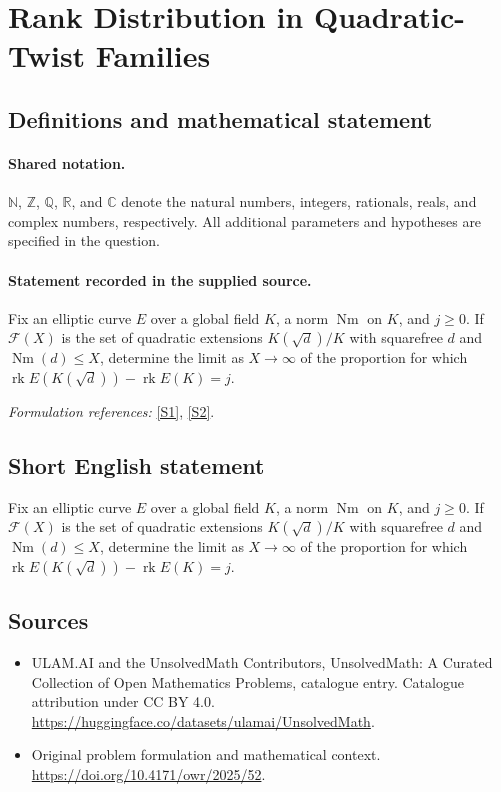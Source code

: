 \documentclass[11pt]{article}
\newcommand{\sref}[2]{\hyperlink{source:#1:#2}{[S#2]}}
\begin{document}
\section{Rank Distribution in Quadratic-Twist Families}\label{statement}

\subsection{Definitions and mathematical statement}

\paragraph{Shared notation.}$\mathbb N$, $\mathbb Z$, $\mathbb Q$, $\mathbb R$, and $\mathbb C$ denote the natural numbers, integers, rationals, reals, and complex numbers, respectively. All additional parameters and hypotheses are specified in the question.


\paragraph{Statement recorded in the supplied source.}
Fix an elliptic curve $E$ over a global field $K$, a norm $\operatorname{Nm}$ on $K$, and $j\geq0$. If $\mathcal{F}(X)$ is the set of quadratic extensions $K(\sqrt{d})/K$ with squarefree $d$ and $\operatorname{Nm}(d)\leq X$, determine the limit as $X\to\infty$ of the proportion for which $\operatorname{rk}E(K(\sqrt{d}))-\operatorname{rk}E(K)=j$.
\par\smallskip\textit{Formulation references:} \sref{statement}{1}, \sref{statement}{2}.
\subsection{Short English statement}
Fix an elliptic curve $E$ over a global field $K$, a norm $\operatorname{Nm}$ on $K$, and $j\geq0$. If $\mathcal{F}(X)$ is the set of quadratic extensions $K(\sqrt{d})/K$ with squarefree $d$ and $\operatorname{Nm}(d)\leq X$, determine the limit as $X\to\infty$ of the proportion for which $\operatorname{rk}E(K(\sqrt{d}))-\operatorname{rk}E(K)=j$.
\subsection{Sources}
\begin{itemize}
\item[\hypertarget{source:statement:1}{S1}] ULAM.AI and the UnsolvedMath Contributors, UnsolvedMath: A Curated Collection of Open Mathematics Problems, catalogue entry. Catalogue attribution under CC BY 4.0.
\url{https://huggingface.co/datasets/ulamai/UnsolvedMath}.
\item[\hypertarget{source:statement:2}{S2}] Original problem formulation and mathematical context.
\url{https://doi.org/10.4171/owr/2025/52}.
\end{itemize}
\label{end:statement}
\end{document}
